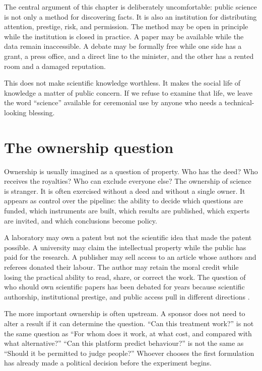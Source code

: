 ﻿\documentclass[12pt,a4paper]{book}
\begin{document}
The central argument of this chapter is deliberately uncomfortable: public
science is not only a method for discovering facts. It is also an institution
for distributing attention, prestige, risk, and permission. The method may be
open in principle while the institution is closed in practice. A paper may be
available while the data remain inaccessible. A debate may be formally free
while one side has a grant, a press office, and a direct line to the minister,
and the other has a rented room and a damaged reputation.

This does not make scientific knowledge worthless. It makes the social life of
knowledge a matter of public concern. If we refuse to examine that life, we
leave the word ``science'' available for ceremonial use by anyone who needs a
technical-looking blessing.

\section{The ownership question}

Ownership is usually imagined as a question of property. Who has the deed?
Who receives the royalties? Who can exclude everyone else? The ownership of
science is stranger. It is often exercised without a deed and without a
single owner. It appears as control over the pipeline: the ability to decide
which questions are funded, which instruments are built, which results are
published, which experts are invited, and which conclusions become policy.

A laboratory may own a patent but not the scientific idea that made the patent
possible. A university may claim the intellectual property while the public
has paid for the research. A publisher may sell access to an article whose
authors and referees donated their labour. The author may retain the moral
credit while losing the practical ability to read, share, or correct the work.
The question of who should own scientific papers has been debated for years
because scientific authorship, institutional prestige, and public access pull
in different directions \cite{blume-aps-copyright}.

The more important ownership is often upstream. A sponsor does not need to
alter a result if it can determine the question. ``Can this treatment work?''
is not the same question as ``For whom does it work, at what cost, and compared
with what alternative?'' ``Can this platform predict behaviour?'' is not the
same as ``Should it be permitted to judge people?'' Whoever chooses the first
formulation has already made a political decision before the experiment
begins.
\end{document}
